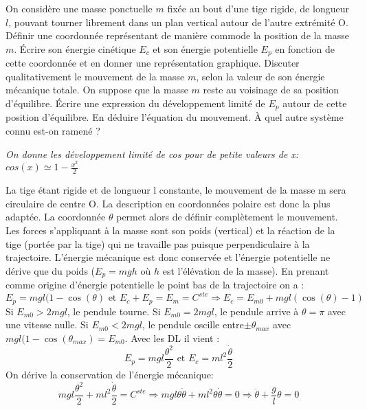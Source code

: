 \begin{Exercise}[title=pendule simple]
On considère une masse ponctuelle $m$ fixée au bout d’une tige rigide, de longueur $l$, pouvant
tourner librement dans un plan vertical autour de l’autre extrémité O.
\Question Définir une coordonnée représentant de manière commode la position de la masse $m$.
\Question Écrire son énergie cinétique $E_c$ et son énergie potentielle $E_p$
en fonction de cette coordonnée et en donner une représentation
graphique.
\Question Discuter qualitativement le mouvement de la masse $m$, selon la valeur de son énergie mécanique totale.
\Question On suppose que la masse $m$ reste au voisinage de sa position d’équilibre. Écrire une expression du développement limité de $E_p$ autour de cette position d’équilibre. En déduire
l’équation du mouvement. À quel autre système connu est-on ramené ?

\emph{On donne les développement limité de cos pour de petite valeurs de x: $cos(x) \simeq 1 -\frac{x^2}{2}$}
\end{Exercise}
\begin{Answer}
\Question La tige étant rigide et de longueur l constante, le mouvement de la masse m sera
circulaire de centre O. La description en coordonnées polaire est donc la plus adaptée.
La coordonnée $\theta$ permet alors de définir complètement le mouvement.
\Question  Les forces s’appliquant à la masse sont son poids (vertical)
et la réaction de la tige (portée par la tige) qui
ne travaille pas puisque perpendiculaire à la trajectoire.
L’énergie mécanique est donc conservée et l’énergie potentielle
ne dérive que du poids ($E_p = mg h $ où $h$ est
l’élévation de la masse). En prenant comme origine d’énergie potentielle le point bas de la trajectoire on a :
\[ E_p=mgl(1-\cos(\theta) \text{ et } E_c+E_p =E_m=C^{ste} \Rightarrow E_c= E_{m0}+mgl(\cos(\theta)-1)\]
\Question
Si $E_{m0} > 2mg l$, le pendule tourne.
Si $E_{m0} = 2mg l$, le pendule arrive à $\theta = \pi$ avec une vitesse nulle.
Si $E_{m0} < 2mg l$, le pendule oscille entre$ \pm \theta_{max}$ avec $mg l(1-\cos(\theta_{max}) = E_{m0}$.
\Question Avec les DL il vient :
\[ E_p = mgl\frac{\theta^2}{2} \text{  et  } E_c= ml^2 \frac{\dot{\theta}}{2}\]
On dérive la conservation de l'énergie mécanique:
\[ mgl\frac{\theta^2}{2} + ml^2 \frac{\dot{\theta}}{2} = C^{ste} \Rightarrow  mgl\theta \dot{\theta}+ml^2\theta \dot{\theta} =0 \Rightarrow \ddot{\theta} + \frac{g}{l} \theta = 0 \]
\end{Answer}
